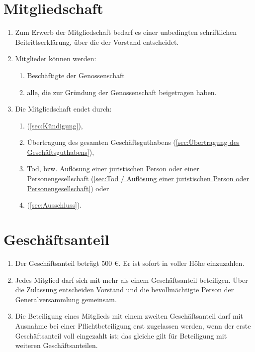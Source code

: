 \documentclass[a4paper, 12pt]{scrartcl}
\begin{document}
\section{Mitgliedschaft}
\begin{enumerate}
  \item Zum Erwerb der Mitgliedschaft bedarf es einer unbedingten schriftlichen Beitrittserklärung, über die der Vorstand entscheidet.
  \item Mitglieder können werden:
    \begin{enumerate}
      \item Beschäftigte der Genossenschaft
      \item alle, die zur Gründung der Genossenschaft beigetragen haben.
    \end{enumerate}
  \item Die Mitgliedschaft endet durch:
  \begin {enumerate}
    \item {} (\ref{sec:Kündigung}),
    \item Übertragung des gesamten Geschäftsguthabens (\ref{sec:Übertragung des Geschäftsguthabens}),
    \item Tod, bzw. Auflösung einer juristischen Person oder einer Personengesellschaft (\ref{sec:Tod / Auflösung einer juristischen Person oder Personengesellschaft}) oder
    \item {} (\ref{sec:Ausschluss}).
  \end{enumerate}
\end{enumerate}

\section{Geschäftsanteil}
\begin{enumerate}
  \item Der Geschäftsanteil beträgt 500 \euro. Er ist sofort in voller Höhe einzuzahlen.
  \item Jedes Mitglied darf sich mit mehr als einem Geschäftsanteil beteiligen. Über die Zulassung entscheiden Vorstand und die bevollmächtigte Person der Generalversammlung gemeinsam.
  \item Die Beteiligung eines Mitglieds mit einem zweiten Geschäftsanteil darf mit Ausnahme bei einer Pflichtbeteiligung erst zugelassen werden, wenn der erste Geschäftsanteil voll eingezahlt ist; das gleiche gilt für Beteiligung mit weiteren Geschäftsanteilen.
\end{enumerate}
\end{document}
